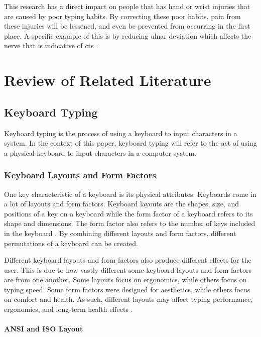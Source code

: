 \documentclass{report}
\begin{document}
This research has a direct impact on people that has hand or wrist injuries that
are caused by poor typing habits. By correcting these poor habits, pain from
these injuries will be lessened, and even be prevented from occurring in the
first place. A specific example of this is by reducing ulnar deviation which
affects the nerve that is indicative of \ac{cts} \parencite{toosi2015}.

\chapter{Review of Related Literature}

\section{Keyboard Typing}

Keyboard typing is the process of using a keyboard to input characters in a
system. In the context of this paper, keyboard typing will refer to the act of
using a physical keyboard to input characters in a computer system.


\subsection{Keyboard Layouts and Form Factors}

One key characteristic of a keyboard is its physical attributes. Keyboards come
in a lot of layouts and form factors. Keyboard layouts are the shapes, size, and
positions of a key on a keyboard while the form factor of a keyboard refers to
its shape and dimensions. The form factor also refers to the number of keys included
in the keyboard \parencite{parkkinen2018}. By combining different layouts and
form factors, different permutations of a keyboard can be created.

Different keyboard layouts and form factors also produce different effects for
the user. This is due to how vastly different some keyboard layouts and form
factors are from one another. Some layouts focus on ergonomics, while others
focus on typing speed. Some form factors were designed for aesthetics, while
others focus on comfort and health. As such, different layouts may affect typing
performance, ergonomics, and long-term health effects \parencite{ciobanu2015}.

\subsubsection{ANSI and ISO Layout}
\end{document}
